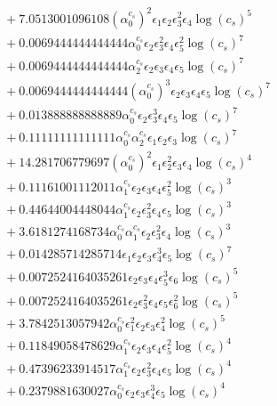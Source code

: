 \documentclass[10pt]{article}
\begin{document}
\begin{align*}
&{}  + 7.0513001096108 \left(\alpha_{0}^{c_s}\right)^{2} \epsilon_{1} \epsilon_{2} \epsilon_{3}^{2} \epsilon_{4} \log{\left(c_{s} \right)}^{5} \\
&{}  + 0.0069444444444444 \alpha_{0}^{c_s} \epsilon_{2} \epsilon_{3}^{2} \epsilon_{4} \epsilon_{5}^{2} \log{\left(c_{s} \right)}^{7} \\
&{}  + 0.0069444444444444 \alpha_{2}^{c_s} \epsilon_{2} \epsilon_{3} \epsilon_{4} \epsilon_{5} \log{\left(c_{s} \right)}^{7} \\
&{}  + 0.0069444444444444 \left(\alpha_{0}^{c_s}\right)^{3} \epsilon_{2} \epsilon_{3} \epsilon_{4} \epsilon_{5} \log{\left(c_{s} \right)}^{7} \\
&{}  + 0.013888888888889 \alpha_{0}^{c_s} \epsilon_{2} \epsilon_{3}^{3} \epsilon_{4} \epsilon_{5} \log{\left(c_{s} \right)}^{7} \\
&{}  + 0.11111111111111 \alpha_{0}^{c_s} \alpha_{2}^{c_s} \epsilon_{1} \epsilon_{2} \epsilon_{3} \log{\left(c_{s} \right)}^{7} \\
&{}  + 14.281706779697 \left(\alpha_{0}^{c_s}\right)^{2} \epsilon_{1} \epsilon_{2}^{2} \epsilon_{3} \epsilon_{4} \log{\left(c_{s} \right)}^{4} \\
&{}  + 0.11161001112011 \alpha_{1}^{c_s} \epsilon_{2} \epsilon_{3} \epsilon_{4} \epsilon_{5}^{2} \log{\left(c_{s} \right)}^{3} \\
&{}  + 0.44644004448044 \alpha_{1}^{c_s} \epsilon_{2} \epsilon_{3}^{2} \epsilon_{4} \epsilon_{5} \log{\left(c_{s} \right)}^{3} \\
&{}  + 3.6181274168734 \alpha_{0}^{c_s} \alpha_{1}^{c_s} \epsilon_{2} \epsilon_{3}^{2} \epsilon_{4} \log{\left(c_{s} \right)}^{3} \\
&{}  + 0.014285714285714 \epsilon_{1} \epsilon_{2} \epsilon_{3} \epsilon_{4}^{3} \epsilon_{5} \log{\left(c_{s} \right)}^{7} \\
&{}  + 0.0072524164035261 \epsilon_{2} \epsilon_{3} \epsilon_{4} \epsilon_{5}^{3} \epsilon_{6} \log{\left(c_{s} \right)}^{5} \\
&{}  + 0.0072524164035261 \epsilon_{2} \epsilon_{3}^{2} \epsilon_{4} \epsilon_{5} \epsilon_{6}^{2} \log{\left(c_{s} \right)}^{5} \\
&{}  + 3.7842513057942 \alpha_{0}^{c_s} \epsilon_{1}^{2} \epsilon_{2} \epsilon_{3} \epsilon_{4}^{2} \log{\left(c_{s} \right)}^{5} \\
&{}  + 0.11849058478629 \alpha_{1}^{c_s} \epsilon_{2} \epsilon_{3} \epsilon_{4} \epsilon_{5}^{2} \log{\left(c_{s} \right)}^{4} \\
&{}  + 0.47396233914517 \alpha_{1}^{c_s} \epsilon_{2} \epsilon_{3}^{2} \epsilon_{4} \epsilon_{5} \log{\left(c_{s} \right)}^{4} \\
&{}  + 0.2379881630027 \alpha_{0}^{c_s} \epsilon_{2} \epsilon_{3} \epsilon_{4}^{3} \epsilon_{5} \log{\left(c_{s} \right)}^{4}
\end{align*}
\end{document}
